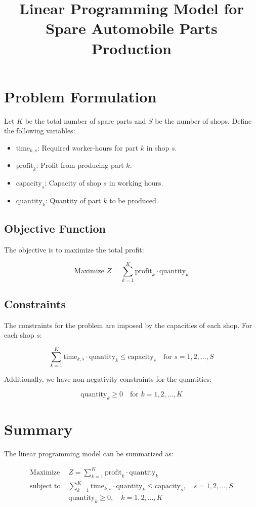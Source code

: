 \documentclass{article}
\begin{document}
\title{Linear Programming Model for Spare Automobile Parts Production}
\author{}
\date{}
\maketitle

\section*{Problem Formulation}

Let \( K \) be the total number of spare parts and \( S \) be the number of shops. Define the following variables:

\begin{itemize}
    \item \( \text{time}_{k, s} \): Required worker-hours for part \( k \) in shop \( s \).
    \item \( \text{profit}_{k} \): Profit from producing part \( k \).
    \item \( \text{capacity}_{s} \): Capacity of shop \( s \) in working hours.
    \item \( \text{quantity}_{k} \): Quantity of part \( k \) to be produced.
\end{itemize}

\subsection*{Objective Function}
The objective is to maximize the total profit:

\[
\text{Maximize } Z = \sum_{k=1}^{K} \text{profit}_{k} \cdot \text{quantity}_{k}
\]

\subsection*{Constraints}
The constraints for the problem are imposed by the capacities of each shop. For each shop \( s \):

\[
\sum_{k=1}^{K} \text{time}_{k, s} \cdot \text{quantity}_{k} \leq \text{capacity}_{s} \quad \text{for } s = 1, 2, \ldots, S
\]

Additionally, we have non-negativity constraints for the quantities:

\[
\text{quantity}_{k} \geq 0 \quad \text{for } k = 1, 2, \ldots, K
\]

\section*{Summary}
The linear programming model can be summarized as:

\[
\begin{align*}
\text{Maximize } & Z = \sum_{k=1}^{K} \text{profit}_{k} \cdot \text{quantity}_{k} \\
\text{subject to } & \sum_{k=1}^{K} \text{time}_{k, s} \cdot \text{quantity}_{k} \leq \text{capacity}_{s}, \quad s = 1, 2, \ldots, S \\
& \text{quantity}_{k} \geq 0, \quad k = 1, 2, \ldots, K
\end{align*}
\]
\end{document}
